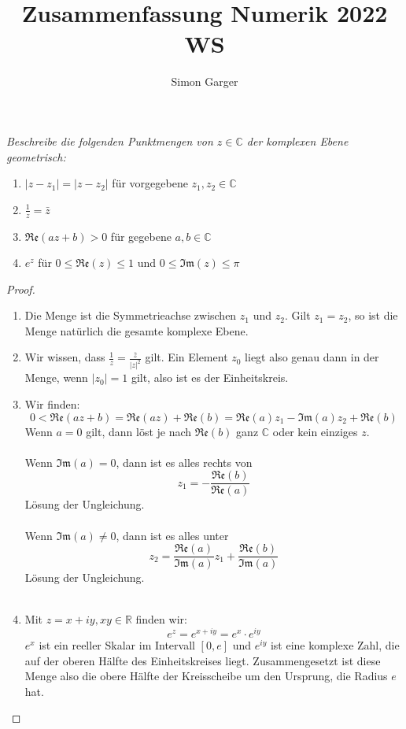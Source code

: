 \documentclass[11pt]{article}
\title{Zusammenfassung Numerik 2022 WS}
\author{Simon Garger}
\newcommand{\R}{\mathbb{R}}
\newcommand{\C}{\mathbb{C}}
\renewcommand{\Re}{\mathfrak{Re}}
\renewcommand{\Im}{\mathfrak{Im}}
\newenvironment{problem}[2][Beispiel]{
    \begin{trivlist}
        \item[\hskip \labelsep {\bfseries #1}\hskip \labelsep {\bfseries #2.}] \itshape}{
    \end{trivlist}\normalshape
}
\begin{document}
    \begin{problem}{1}
        Beschreibe die folgenden Punktmengen von $z\in \C$ der komplexen Ebene
        geometrisch:
        \begin{enumerate}[label=(\alph*)]
            \item $|z-z_1| = |z-z_2|$ für vorgegebene $z_1,z_2\in\C$
            \item $\frac{1}{z}=\bar{z}$
            \item $\Re(az+b)>0$ für gegebene $a,b\in\C$
            \item $e^z$ für $0\leq \Re(z)\leq 1$ und $0\leq \Im(z)\leq \pi$
        \end{enumerate}
    \end{problem}

    \begin{proof}
        \begin{enumerate}[label=(\alph*)]
            \item Die Menge ist die Symmetrieachse zwischen $z_1$ und $z_2$.
            Gilt $z_1=z_2$, so ist die Menge natürlich die gesamte komplexe Ebene.
            \item Wir wissen, dass $\frac{1}{z}=\frac{\bar{z}}{|z|^2}$ gilt.
            Ein Element $z_0$ liegt also genau dann in der Menge, wenn $|z_0|=1$ gilt,
            also ist es der Einheitskreis.
            \item Wir finden:
            $$0<\Re(az+b) =\Re(az) + \Re(b) = \Re(a)z_1 -\Im(a)z_2 +\Re(b)$$
            Wenn $a=0$ gilt, dann löst je nach $\Re(b)$ ganz $\C$ oder kein einziges $z$.\\\\
            Wenn $\Im(a)=0$, dann ist es alles rechts von
            $$z_1 = -\frac{\Re(b)}{\Re(a)}$$
            Lösung der Ungleichung. \\\\
            Wenn $\Im(a)\neq 0$, dann ist es alles unter
            $$z_2 =\frac{\Re(a)}{\Im(a)}z_1 +\frac{\Re(b)}{\Im(a)}$$
            Lösung der Ungleichung. \\\\
            \item Mit $z=x+iy,xy\in\R$ finden wir:
            $$e^z = e^{x+iy} = e^x\cdot e^{iy}$$
            $e^x$ ist ein reeller Skalar im Intervall $[0,e]$ und $e^{iy}$ ist
            eine komplexe Zahl, die auf der oberen Hälfte des Einheitskreises liegt.
            Zusammengesetzt ist diese Menge also die obere Hälfte der Kreisscheibe
            um den Ursprung, die Radius $e$ hat.
        \end{enumerate}
    \end{proof}
\end{document}
